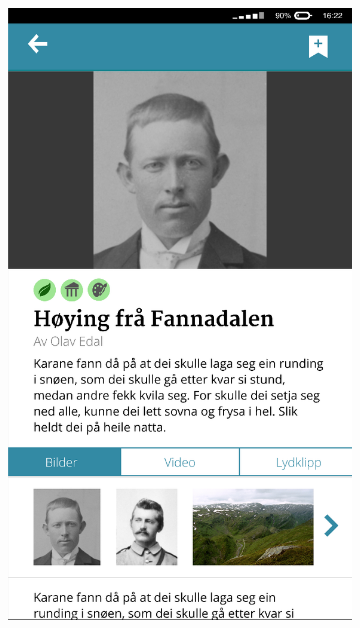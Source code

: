 \begin{figure}
\begin{subfigure}[h]{0.3\textwidth}
		\includegraphics[width=\textwidth]{fig/prototype2}
	\end{subfigure}
	\begin{subfigure}[h]{0.3\textwidth}

\end{subfigure}
\end{figure}
